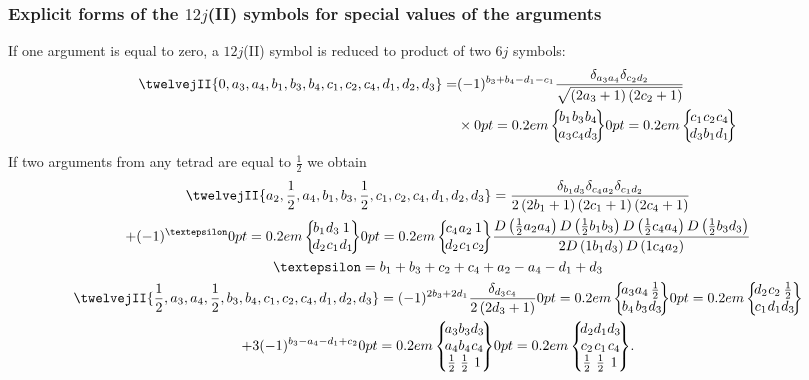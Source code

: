\subsubsection{Explicit forms of the $12j$(II) symbols for special values of the arguments}

If one argument is equal to zero, a $12j$(II) symbol is reduced to product of two $6 j$ symbols:
\begin{align}
\twelvejII{0,a_{3},a_{4},b_{1},b_{3},b_{4},c_{1},c_{2},c_{4},d_{1},d_{2},d_{3}}= & (-1)^{b_{3}+b_{4}-d_{1}-c_{1}} \frac{\delta_{a_{3} a_{4}} \delta_{c_{2} d_{2}}}{\sqrt{\left(2 a_{3}+1\right)\left(2 c_{2}+1\right)}}  \notag\\
& \times\sixj{b_{1}}{b_{3}}{b_{4}}{a_{3}}{c_{4}}{d_{3}}\sixj{c_{1}}{c_{2}}{c_{4}}{d_{3}}{b_{1}}{d_{1}} \label{eq:10:13:33}
\end{align}
If two arguments from any tetrad are equal to $\frac{1}{2}$ we obtain
\begin{gather}
\twelvejII{a_{2},\frac{1}{2},a_{4},b_{1},b_{3},\frac{1}{2},c_{1},c_{2},c_{4},d_{1},d_{2},d_{3}}=\frac{\delta_{b_{1} d_{3}} \delta_{c_{4} a_{2}} \delta_{c_{1} d_{2}}}{2\left(2 b_{1}+1\right)\left(2 c_{1}+1\right)\left(2 c_{4}+1\right)}  \notag\\
+(-1)^{\varepsilon}\sixj{b_{1}}{d_{3}}{1}{d_{2}}{c_{1}}{d_{1}}\sixj{c_{4}}{a_{2}}{1}{d_{2}}{c_{1}}{c_{2}} \frac{D\left(\frac{1}{2} a_{2} a_{4}\right) D\left(\frac{1}{2} b_{1} b_{3}\right) D\left(\frac{1}{2} c_{4} a_{4}\right) D\left(\frac{1}{2} b_{3} d_{3}\right)}{2 D\left(1 b_{1} d_{3}\right) D\left(1 c_{4} a_{2}\right)}  \label{eq:10:13:34}\\
\varepsilon=b_{1}+b_{3}+c_{2}+c_{4}+a_{2}-a_{4}-d_{1}+d_{3}  \notag\\
\twelvejII{\frac{1}{2},a_{3},a_{4},\frac{1}{2},b_{3},b_{4},c_{1},c_{2},c_{4},d_{1},d_{2},d_{3}}=(-1)^{2 b_{3}+2 d_{1}} \frac{\delta_{d_{3} c_{4}}}{2\left(2 d_{3}+1\right)}\sixj{a_{3}}{a_{4}}{\frac{1}{2}}{b_{4}}{b_{3}}{d_{3}}\sixj{d_{2}}{c_{2}}{\frac{1}{2}}{c_{1}}{d_{1}}{d_{3}}  \notag\\
+3(-1)^{b_{3}-a_{4}-d_{1}+c_{2}}\ninej{a_{3}}{b_{3}}{d_{3}}{a_{4}}{b_{4}}{c_{4}}{\frac{1}{2}}{\frac{1}{2}}{1}\ninej{d_{2}}{d_{1}}{d_{3}}{c_{2}}{c_{1}}{c_{4}}{\frac{1}{2}}{\frac{1}{2}}{1} . \label{eq:10:13:35}
\end{gather}
